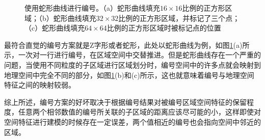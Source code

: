 \documentclass[master]{thesis-uestc}
\begin{document}
\begin{figure}[!ht]
\centering
{}
\hfill
{}
\hfill
{}
\caption{使用蛇形曲线进行编号。（a）蛇形曲线填充$16 \times 16$比例的正方形区域；（b）蛇形曲线填充$32 \times 32$比例的正方形区域，并标记了三个点；（c）蛇形曲线填充$64 \times 64$比例的正方形区域时被标记点的位置}
\label{Figure.4.1.3}
\end{figure}
最符合直觉的编号方案就是Z字形或者蛇形，此处以蛇形曲线为例，如图\ref{Figure.4.1.3}(a)所示，一次对一行进行编号，在区域空间中交替推进。但是蛇形曲线存在一个严重的问题，当使用不同粒度的子区域进行区域划分时，编号空间中的许多点就会映射到地理空间中完全不同的部分，如图\ref{Figure.4.1.3}(b)和(c)所示，这也就意味着编号与地理空间特征之间的映射较弱。

综上所述，编号方案的好坏取决于根据编号结果对被编号区域空间特征的保留程度，任意两个相邻数值的编号所关联的子区域的距离应该尽可能的小，这样即使对空间特征进行建模的时候存在一定误差，两个值相近的编号也会指向空间中邻近的区域。
\end{document}

